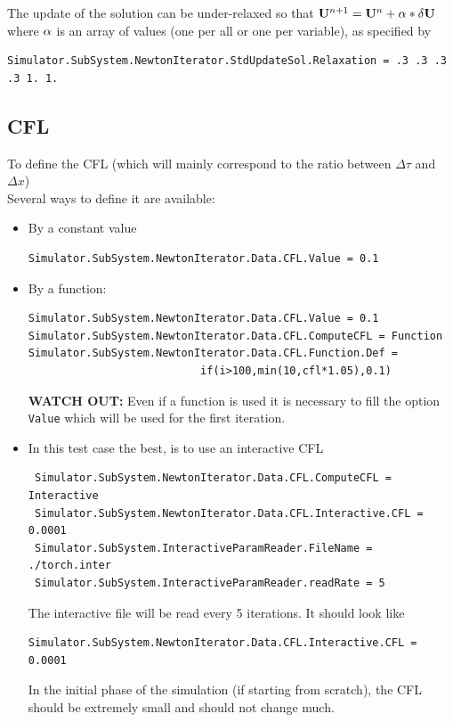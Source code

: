 \documentclass[11pt]{article}
\begin{document}
The update of the solution can be under-relaxed so that ${\bf U}^{n+1} = {\bf U}^{n} + {\bf \alpha}*{\bf \delta U}$
where ${\bf \alpha}$ is an array of values (one per all or one per variable), as specified by 
\begin{verbatim}
Simulator.SubSystem.NewtonIterator.StdUpdateSol.Relaxation = .3 .3 .3 .3 1. 1.
\end{verbatim}

\subsection{CFL}
To define the CFL (which will mainly correspond to the ratio between $\Delta \tau$ and $\Delta x$)\\
Several ways to define it are available:
\begin{itemize}
\item By a constant value
\begin{verbatim}
Simulator.SubSystem.NewtonIterator.Data.CFL.Value = 0.1
\end{verbatim}
\item By a function:
\begin{verbatim}
Simulator.SubSystem.NewtonIterator.Data.CFL.Value = 0.1
Simulator.SubSystem.NewtonIterator.Data.CFL.ComputeCFL = Function 
Simulator.SubSystem.NewtonIterator.Data.CFL.Function.Def = 
                           if(i>100,min(10,cfl*1.05),0.1)
\end{verbatim}
{\bf WATCH OUT:} Even if a function is used it is necessary to fill the option \texttt{Value} which
 will be used for the first iteration.

\item In this test case the best, is to use an interactive CFL
\begin{verbatim}
 Simulator.SubSystem.NewtonIterator.Data.CFL.ComputeCFL = Interactive
 Simulator.SubSystem.NewtonIterator.Data.CFL.Interactive.CFL = 0.0001
 Simulator.SubSystem.InteractiveParamReader.FileName = ./torch.inter
 Simulator.SubSystem.InteractiveParamReader.readRate = 5
\end{verbatim}
The interactive file will be read every 5 iterations. It should look like
\begin{verbatim}
Simulator.SubSystem.NewtonIterator.Data.CFL.Interactive.CFL = 0.0001
\end{verbatim}
In the initial phase of the simulation (if starting from scratch), 
the CFL should be extremely small and should not change much.
\end{itemize}
\end{document}
